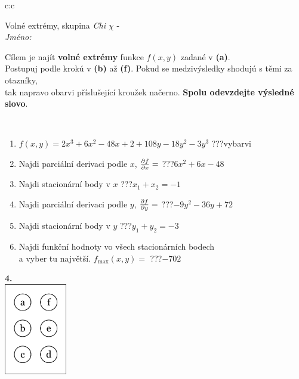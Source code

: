\documentclass[10pt]{report}
\begin{document}
\begin{tabular}{c:c}
\begin{minipage}[c][104.5mm][t]{0.5\linewidth}
\begin{center}
\vspace{7mm}
{\huge Volné extrémy, skupina \textit{Chi $\chi$} -}\\[5mm]
\textit{Jméno:}\phantom{xxxxxxxxxxxxxxxxxxxxxxxxxxxxxxxxxxxxxxxxxxxxxxxxxxxxxxxxxxxxxxxxx}\\[5mm]
\begin{minipage}{0.95\linewidth}
\begin{center}
Cílem je najít \textbf{volné extrémy} funkce $f(x,y)$ zadané v \textbf{(a)}.\\Postupuj podle krokú v \textbf{(b)} až \textbf{(f)}. Pokud se medzivýsledky shodujú s těmi za otazníky,\\tak napravo obarvi příslušející kroužek načerno. \textbf{Spolu odevzdejte výsledné slovo}.
\end{center}
\end{minipage}
\\[1mm]
\begin{minipage}{0.79\linewidth}
\begin{center}
\begin{varwidth}{\linewidth}
\begin{enumerate}
\normalsize
\item $f(x,y)=2x^3+6x^2-48x+2+108y-18y^2-3y^3$\quad \dotfill\; ???\;\dotfill \quad vybarvi
\item Najdi parciální derivaci podle $x$, $\pdv{f}{x}=$\quad \dotfill\; ???\;\dotfill \quad $6x^2+6x-48$
\item Najdi stacionární body v $x$\quad \dotfill\; ???\;\dotfill \quad $x_1+x_2=-1$
\item Najdi parciální derivaci podle $y$, $\pdv{f}{y}=$\quad \dotfill\; ???\;\dotfill \quad $-9y^2-36y+72$
\item Najdi stacionární body v $y$\quad \dotfill\; ???\;\dotfill \quad $y_1+y_2=-3$
\item Najdi funkční hodnoty vo všech stacionárních bodech \\ \phantom{xxxxxx} a vyber tu najvětší. $f_{\text{max}}(x,y)=$\quad \dotfill\; ???\;\dotfill \quad $-702$
\end{enumerate}
\end{varwidth}
\end{center}
\end{minipage}
\begin{minipage}{0.20\linewidth}
\begin{center}
{\Huge\bfseries 4.} \\[2mm]
\includegraphics[height=40mm]{../images/braille.png}

\end{center}
\end{minipage}
\end{center}
\end{minipage}
\end{tabular}
\end{document}
